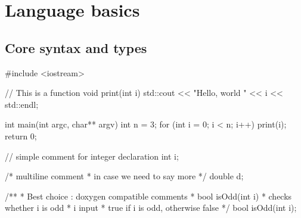 \section[base]{Language basics}

\subsection[Core]{Core syntax and types}

\begin{frame}[fragile]
  \begin{cppcode}
    #include <iostream>

    // This is a function
    void print(int i) {
      std::cout << "Hello, world " << i << std::endl;
    }

    int main(int argc, char** argv) {
      int n = 3;
      for (int i = 0; i < n; i++) {
        print(i);
      }
      return 0;
    }
  \end{cppcode}
\end{frame}

\begin{frame}[fragile]
  \begin{cppcode}
    // simple comment for integer declaration
    int i;

    /* multiline comment
     * in case we need to say more
     */
    double d;

    /**
     * Best choice : doxygen compatible comments
     * \fn bool isOdd(int i)
     * \brief checks whether i is odd
     * \param i input
     * \return true if i is odd, otherwise false
     */
    bool isOdd(int i);
  \end{cppcode}
\end{frame}

